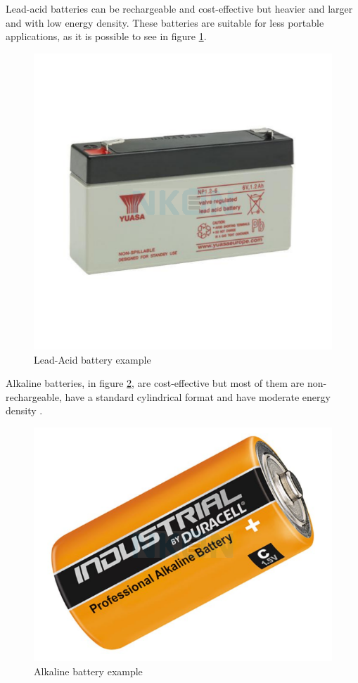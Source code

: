 Lead-acid batteries can be rechargeable and cost-effective but heavier and larger and with low energy density.
These batteries are suitable for less portable applications, \cite{BATT3} as it is possible to see in figure \ref{fig:lead}.
\begin{figure}[H]
    \centering
    \includegraphics[scale=0.4]{ch3/assets/lead.png}
    \caption{Lead-Acid battery example \cite{lead}}
    \label{fig:lead}
\end{figure}

Alkaline batteries, in figure \ref{fig:alkaline}, are cost-effective but most of them are non-rechargeable, have a standard cylindrical format and have moderate energy density \cite{BATT3}.
\begin{figure}[H]
    \centering
    \includegraphics[scale=0.3]{ch3/assets/alkaline.png}
    \caption{Alkaline battery example \cite{alkaline}}
    \label{fig:alkaline}
\end{figure}

